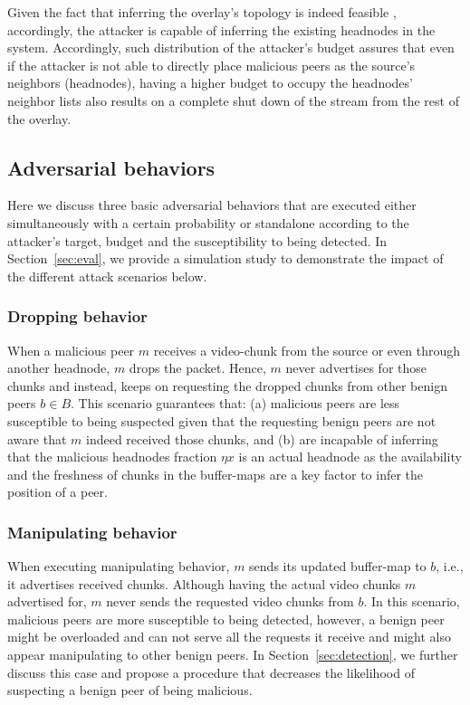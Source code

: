 Given the fact that inferring the overlay's topology is indeed feasible \cite{nguyen2016swap,rbcs}, accordingly, the attacker is capable of inferring the existing headnodes in the system.
Accordingly, such distribution of the attacker's budget assures that even if the attacker is not able to directly place malicious peers as the source's neighbors (headnodes), having a higher budget to occupy the headnodes' neighbor lists also results on a complete shut down of the stream from the rest of the overlay.

\subsection{Adversarial behaviors}
Here we discuss three basic adversarial behaviors that are executed either simultaneously with a certain probability or standalone according to the attacker's target, budget and the susceptibility to being detected.
In Section~\ref{sec:eval}, we provide a simulation study to demonstrate the impact of the different attack scenarios below.

\subsubsection*{Dropping behavior}
When a malicious peer $m$ receives a video-chunk from the source or even through another headnode, $m$ drops the packet. 
Hence, $m$ never advertises for those chunks and instead, keeps on requesting the dropped chunks from other benign peers $b \in B$.
This scenario guarantees that: (a) malicious peers are less susceptible to being suspected given that the requesting benign peers are not aware that $m$ indeed received those chunks,
and (b) are incapable of inferring that the malicious headnodes fraction $\eta x$ is an actual headnode as the availability and the freshness of chunks in the buffer-maps are a key factor to infer the position of a peer.


\subsubsection*{Manipulating behavior}
When executing manipulating behavior, $m$ sends its updated buffer-map to $b$, i.e., it advertises received chunks. 
Although having the actual video chunks $m$ advertised for, $m$ never sends the requested video chunks from $b$.
In this scenario, malicious peers are more susceptible to being detected, however, a benign peer might be overloaded and can not serve all the requests it receive and might also appear manipulating to other benign peers.
In Section~\ref{sec:detection}, we further discuss this case and propose a procedure that decreases the likelihood of suspecting a benign peer of being malicious.


